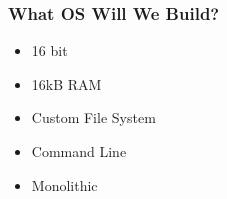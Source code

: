 \documentclass[10pt]{beamer}
\begin{document}
  \begin{frame}
    \frametitle{What OS Will We Build?}
    \begin{itemize}
      \item 16 bit
      \item 16kB RAM
      \item Custom File System
      \item Command Line
      \item Monolithic
    \end{itemize}
  \end{frame}
\end{document}
